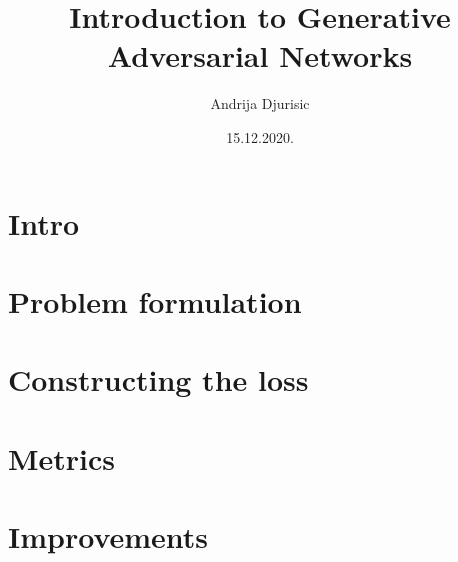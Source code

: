 \documentclass{article}
\title{Introduction to Generative Adversarial Networks}
\author{Andrija Djurisic}
\date{15.12.2020.}
\begin{document}
   \maketitle

\section{Intro}
\section{Problem formulation}
\section{Constructing the loss}
\section{Metrics}
\section{Improvements}
\end{document}
